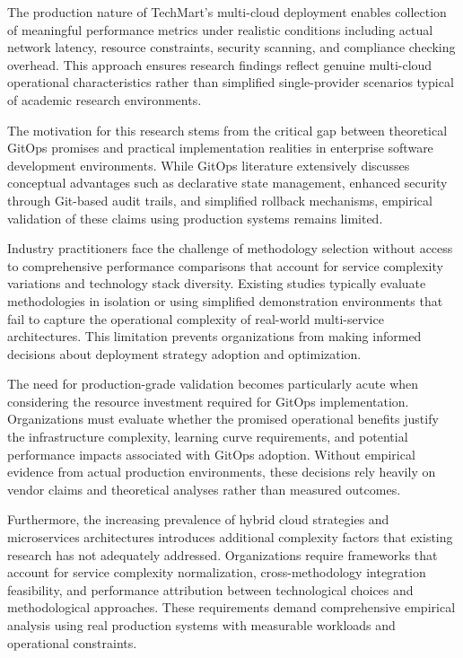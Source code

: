 The production nature of TechMart's multi-cloud deployment enables collection of meaningful performance metrics under realistic conditions including actual network latency, resource constraints, security scanning, and compliance checking overhead. This approach ensures research findings reflect genuine multi-cloud operational characteristics rather than simplified single-provider scenarios typical of academic research environments.

The motivation for this research stems from the critical gap between theoretical GitOps promises and practical implementation realities in enterprise software development environments. While GitOps literature extensively discusses conceptual advantages such as declarative state management, enhanced security through Git-based audit trails, and simplified rollback mechanisms, empirical validation of these claims using production systems remains limited.

Industry practitioners face the challenge of methodology selection without access to comprehensive performance comparisons that account for service complexity variations and technology stack diversity. Existing studies typically evaluate methodologies in isolation or using simplified demonstration environments that fail to capture the operational complexity of real-world multi-service architectures. This limitation prevents organizations from making informed decisions about deployment strategy adoption and optimization.

The need for production-grade validation becomes particularly acute when considering the resource investment required for GitOps implementation. Organizations must evaluate whether the promised operational benefits justify the infrastructure complexity, learning curve requirements, and potential performance impacts associated with GitOps adoption. Without empirical evidence from actual production environments, these decisions rely heavily on vendor claims and theoretical analyses rather than measured outcomes.

Furthermore, the increasing prevalence of hybrid cloud strategies and microservices architectures introduces additional complexity factors that existing research has not adequately addressed. Organizations require frameworks that account for service complexity normalization, cross-methodology integration feasibility, and performance attribution between technological choices and methodological approaches. These requirements demand comprehensive empirical analysis using real production systems with measurable workloads and operational constraints.

